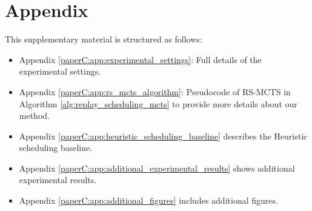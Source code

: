 

\section*{Appendix}
This supplementary material is structured as follows: 
\begin{itemize}
	\item Appendix \ref{paperC:app:experimental_settings}: Full details of the experimental settings.
	\item Appendix \ref{paperC:app:rs_mcts_algorithm}: Pseudocode of RS-MCTS in Algorithm \ref{alg:replay_scheduling_mcts} to provide more details about our method. 
	\item Appendix \ref{paperC:app:heuristic_scheduling_baseline} describes the Heuristic scheduling baseline.
	\item Appendix \ref{paperC:app:additional_experimental_results} shows additional experimental results. 
	\item Appendix \ref{paperC:app:additional_figures} includes additional figures. 
\end{itemize}




%
%

%









\clearpage



\clearpage



